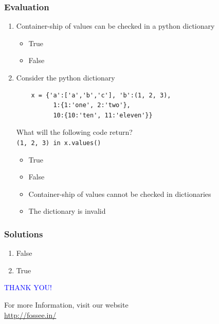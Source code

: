 \documentclass[presentation]{beamer}
\begin{document}
\begin{frame}[fragile]
\frametitle{Evaluation}
\label{sec-8}


\begin{enumerate}
\item Container-ship of values can be checked in a python dictionary
\begin{itemize}
\item True
\item False
\vspace{5pt}
\end{itemize}
\item Consider the python dictionary 
   
\begin{verbatim}
    x = {'a':['a','b','c'], 'b':(1, 2, 3),
          1:{1:'one', 2:'two'},
          10:{10:'ten', 11:'eleven'}}
\end{verbatim}


   What will the following code return?\\ 
     \verb~(1, 2, 3) in x.values()~
\vspace{3pt}     
\begin{itemize}
\item True
\item False
\item Container-ship of values cannot be checked in dictionaries
\item The dictionary is invalid
\end{itemize}
\end{enumerate}
\end{frame}
\begin{frame}
\frametitle{Solutions}
\label{sec-9}


\begin{enumerate}
\item False
\vspace{15pt}
\item True
\end{enumerate}
\end{frame}
\begin{frame}

  \begin{block}{}
  \begin{center}
  \textcolor{blue}{\Large THANK YOU!} 
  \end{center}
  \end{block}
\begin{block}{}
  \begin{center}
    For more Information, visit our website\\
    \url{http://fossee.in/}
  \end{center}  
  \end{block}
\end{frame}
\end{document}
